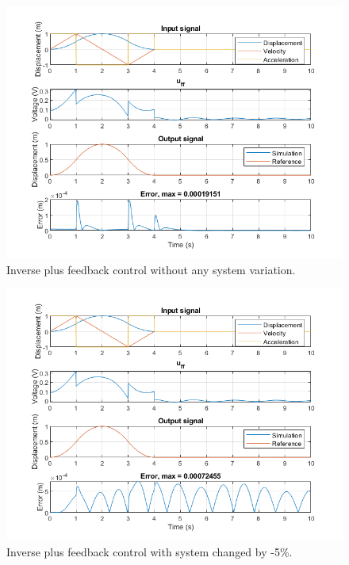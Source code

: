 \documentclass[12pt]{article}
\begin{document}
\begin{enumerate}[(a)]
    \begin{figure}[h]
      \includegraphics{no_error_ff_fb.png}
      \centering
      \caption{Inverse plus feedback control without any system variation.}
    \end{figure}

    \begin{figure}[h]
      \includegraphics{n5_error_ff_fb.png}
      \centering
      \caption{Inverse plus feedback control with system changed by -5\%.}
    \end{figure}


\end{enumerate}
\end{document}
